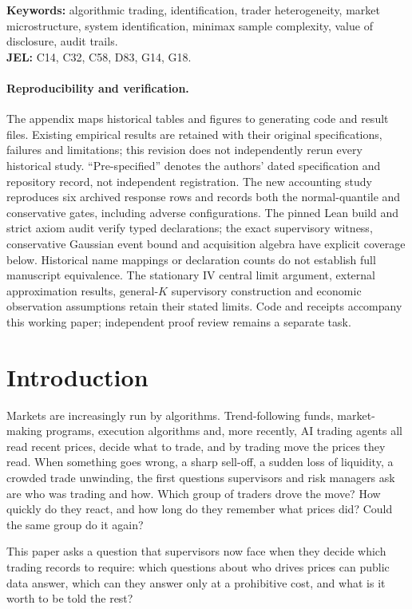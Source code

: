 \documentclass[12pt]{article}
\theoremstyle{definition}
\theoremstyle{remark}
\begin{document}
\noindent\textbf{Keywords:} algorithmic trading, identification, trader heterogeneity, market microstructure, system identification, minimax sample complexity, value of disclosure, audit trails.\\
\textbf{JEL:} C14, C32, C58, D83, G14, G18.

\paragraph{Reproducibility and verification.} The appendix maps historical tables and figures to generating code and result files. Existing empirical results are retained with their original specifications, failures and limitations; this revision does not independently rerun every historical study. ``Pre-specified'' denotes the authors' dated specification and repository record, not independent registration. The new accounting study reproduces six archived response rows and records both the normal-quantile and conservative gates, including adverse configurations. The pinned Lean build and strict axiom audit verify typed declarations; the exact supervisory witness, conservative Gaussian event bound and acquisition algebra have explicit coverage below. Historical name mappings or declaration counts do not establish full manuscript equivalence. The stationary IV central limit argument, external approximation results, general-$K$ supervisory construction and economic observation assumptions retain their stated limits. Code and receipts accompany this working paper; independent proof review remains a separate task.

\endgroup
\newpage
\setcounter{page}{1}

\section{Introduction}

Markets are increasingly run by algorithms. Trend-following funds, market-making programs, execution algorithms and, more recently, AI trading agents all read recent prices, decide what to trade, and by trading move the prices they read. When something goes wrong, a sharp sell-off, a sudden loss of liquidity, a crowded trade unwinding, the first questions supervisors and risk managers ask are who was trading and how. Which group of traders drove the move? How quickly do they react, and how long do they remember what prices did? Could the same group do it again?

This paper asks a question that supervisors now face when they decide which trading records to require: which questions about who drives prices can public data answer, which can they answer only at a prohibitive cost, and what is it worth to be told the rest?
\end{document}
